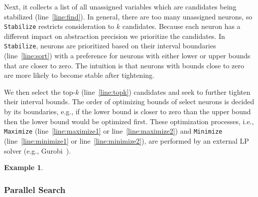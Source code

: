 \documentclass[oneside,11pt,dvipsnames]{book}
\numberwithin{equation}{section}
\theoremstyle{definition}
\newtheorem{example}{Example}[section]
\theoremstyle{remark}
\newcommand{\functiontextformat}[1]{\textrm{\texttt{#1}}}
\newcommand{\tvn}[1]{\iftoggle{usecomment}{{\color{red}{[TVN]: #1}}}{}}
\newcommand{\tool}{\texttt{NeuralSAT}}
\begin{document}
Next, it collects a list of all unassigned variables which are candidates being stabilized (line~\ref{line:find}).
In general, there are too many unassigned neurons, so
\functiontextformat{Stabilize} restricts consideration to $k$ candidates.
Because each neuron has a different impact on abstraction precision we prioritize the candidates.
In \functiontextformat{Stabilize}, neurons are prioritized based on their interval boundaries (line~\ref{line:sort}) with a preference for neurons with either lower or upper bounds that are closer to zero.
The intuition is that neurons with bounds close to zero are more likely to become stable after tightening.

We then select the top-$k$ (line~\ref{line:topk}) candidates and seek to further tighten their interval bounds.
The order of optimizing bounds of select neurons is decided by its boundaries, e.g., if the lower bound is closer to zero than the upper bound then the lower bound would be optimized first.
These optimization processes, i.e., \functiontextformat{Maximize} (line~\ref{line:maximize1} or line~\ref{line:maximize2}) and \functiontextformat{Minimize} (line~\ref{line:minimize1} or line~\ref{line:minimize2}), are performed by an external LP solver (e.g., Gurobi~\cite{gurobi}).




\begin{example}
  \tvn{Need a concrete example here.  Use the DNN in~\autoref{fig:dnn} and create the MILP system in ~\autoref{eq:mip}.}
\end{example}

\subsubsection{Parallel Search}\label{sec:parallel-search}
\end{document}
